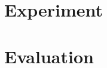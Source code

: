 \documentclass[a4paper,12pt]{article}
\begin{document}
\section{Experiment}


\section{Evaluation}





\end{document}
